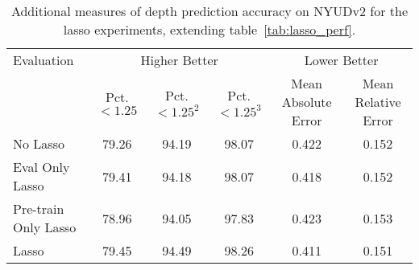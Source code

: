 \documentclass[10pt,twocolumn,letterpaper]{article}
\begin{document}
\begin{table*}
\begin{center}
\begin{tabular}{l|c|c|c|c|c}
\hline
Evaluation & \multicolumn{3}{|c|}{Higher Better} & \multicolumn{2}{|c}{Lower Better} \\ \cline{2-6}
           & Pct. $< 1.25$ & Pct. $< 1.25^2$& Pct. $< 1.25^3$ & Mean Absolute Error & Mean Relative Error \\
           
\hline\hline
No Lasso &  79.26 &    94.19 &    98.07 &    0.422 &    0.152\\
\hline
Eval Only Lasso & 79.41 &    94.18 &    98.07 &    0.418 &    0.152\\
\hline
Pre-train Only Lasso &78.96 &    94.05 &    97.83 &    0.423 &    0.153\\
\hline
Lasso & 79.45 &    94.49 &    98.26 &    0.411 &    0.151\\
\hline
\end{tabular}
\end{center}
\caption{Additional measures of depth prediction accuracy on NYUDv2 for the lasso experiments, extending table~\ref{tab:lasso_perf}.}
\label{tab:lasso}
\end{table*}

{\small


}
\end{document}
